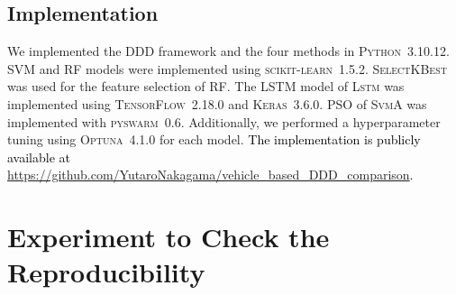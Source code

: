 \documentclass[letterpaper, 10 pt, conference]{ieeeconf}  %
\newcommand{\Review}[1]{\textcolor{black}{#1}}
\newcommand{\Impl}[1]{\textsc{#1}}
\begin{document}
\subsection{Implementation}\label{sec:impl}

We implemented the DDD framework and the four methods in \Impl{Python}~3.10.12.
SVM and RF models were implemented using \Impl{scikit-learn}~1.5.2. 
\Impl{SelectKBest} was used for the feature selection of \Impl{RF}.
The LSTM model of \Impl{Lstm} was implemented using \Impl{TensorFlow}~2.18.0 and \Impl{Keras}~3.6.0. 
PSO of \Impl{SvmA} was implemented with \Impl{pyswarm}~0.6.
%
Additionally, we performed a hyperparameter tuning using \Impl{Optuna}~4.1.0 for each model.
\Review{The implementation is publicly available at \url{https://github.com/YutaroNakagama/vehicle_based_DDD_comparison}.}


%

\section{Experiment to Check the Reproducibility}\label{sec:exp1}
\end{document}
